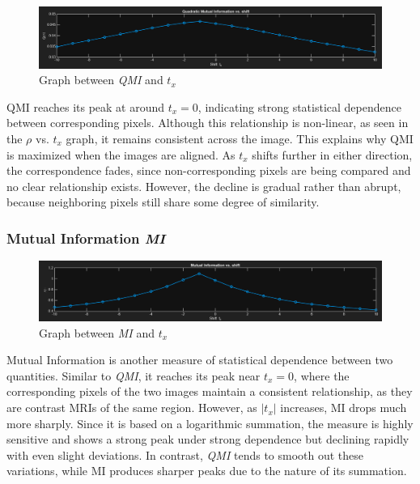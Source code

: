 \documentclass{report}
\begin{document}
\begin{figure}[h]
    \centering
    \includegraphics[width=\textwidth]{q4_0_qmi.png}
    \caption{Graph between \textit{QMI} and $t_x$}
\end{figure}

QMI reaches its peak at around $t_x = 0$, indicating strong statistical dependence between corresponding pixels. Although this relationship is non-linear, as seen in the $\rho$ vs. $t_x$ graph, it remains consistent across the image. This explains why QMI is maximized when the images are aligned. As $t_x$ shifts further in either direction, the correspondence fades, since non-corresponding pixels are being compared and no clear relationship exists. However, the decline is gradual rather than abrupt, because neighboring pixels still share some degree of similarity.

\vspace{1em}

\newpage
\subsubsection*{Mutual Information \textit{MI}}

\begin{figure}[h]
    \centering
    \includegraphics[width=\textwidth]{q4_0_mi.png}
    \caption{Graph between \textit{MI} and $t_x$}
\end{figure}

Mutual Information is another measure of statistical dependence between two quantities. Similar to \textit{QMI}, it reaches its peak near $t_x = 0$, where the corresponding pixels of the two images maintain a consistent relationship, as they are contrast MRIs of the same region. However, as $|t_x|$ increases, MI drops much more sharply. Since it is based on a logarithmic summation, the measure is highly sensitive and shows a strong peak under strong dependence but declining rapidly with even slight deviations. In contrast, \textit{QMI} tends to smooth out these variations, while MI produces sharper peaks due to the nature of its summation.
\end{document}
